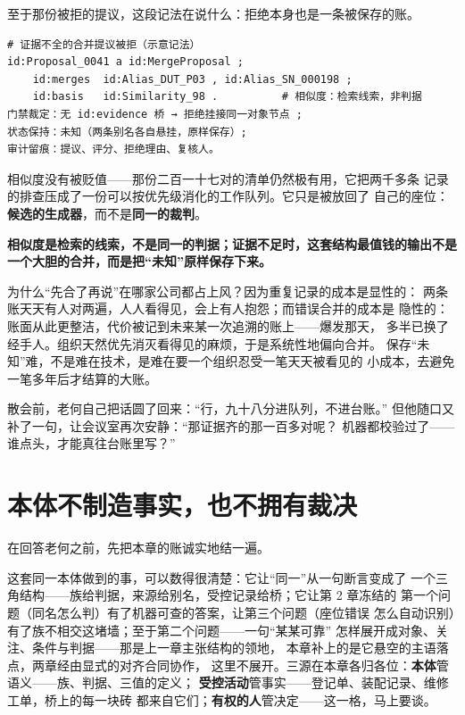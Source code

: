 至于那份被拒的提议，这段记法在说什么：拒绝本身也是一条被保存的账。

\nopagebreak[4]
\begin{codebox}
\begin{Verbatim}[fontsize=\small,breaklines=true,breakanywhere=true,breaksymbolleft={},breaksymbolright={}]
# 证据不全的合并提议被拒（示意记法）
id:Proposal_0041 a id:MergeProposal ;
    id:merges  id:Alias_DUT_P03 , id:Alias_SN_000198 ;
    id:basis   id:Similarity_98 .          # 相似度：检索线索，非判据
门禁裁定：无 id:evidence 桥 → 拒绝挂接同一对象节点 ;
状态保持：未知（两条别名各自悬挂，原样保存）;
审计留痕：提议、评分、拒绝理由、复核人。
\end{Verbatim}
\end{codebox}

相似度没有被贬值——那份二百一十七对的清单仍然极有用，它把两千多条
记录的排查压成了一份可以按优先级消化的工作队列。它只是被放回了
自己的座位：\textbf{候选的生成器}，而不是\textbf{同一的裁判}。

\textbf{相似度是检索的线索，不是同一的判据；证据不足时，这套结构最值钱的输出不是一个大胆的合并，而是把“未知”原样保存下来。}

为什么“先合了再说”在哪家公司都占上风？因为重复记录的成本是显性的：
两条账天天有人对两遍，人人看得见，会上有人抱怨；而错误合并的成本是
隐性的：账面从此更整洁，代价被记到未来某一次追溯的账上——爆发那天，
多半已换了经手人。组织天然优先消灭看得见的麻烦，于是系统性地偏向合并。
保存“未知”难，不是难在技术，是难在要一个组织忍受一笔天天被看见的
小成本，去避免一笔多年后才结算的大账。

散会前，老何自己把话圆了回来：“行，九十八分进队列，不进台账。”
但他随口又补了一句，让会议室再次安静：“那证据齐的那一百多对呢？
机器都校验过了——谁点头，才能真往台账里写？”

\section{本体不制造事实，也不拥有裁决}

在回答老何之前，先把本章的账诚实地结一遍。

这套同一本体做到的事，可以数得很清楚：它让“同一”从一句断言变成了
一个三角结构——族给判据，来源给别名，受控记录给桥；它让第 2 章冻结的
第一个问题（同名怎么判）有了机器可查的答案，让第三个问题（座位错误
怎么自动识别）有了族不相交这堵墙；至于第二个问题——一句“某某可靠”
怎样展开成对象、关注、条件与判据——那是上一章主张结构的领地，
本章补上的是它悬空的主语落点，两章经由显式的对齐合同协作，
这里不展开。三源在本章各归各位：\textbf{本体}管语义——族、判据、三值的定义；
\textbf{受控活动}管事实——登记单、装配记录、维修工单，桥上的每一块砖
都来自它们；\textbf{有权的人}管决定——这一格，马上要谈。

